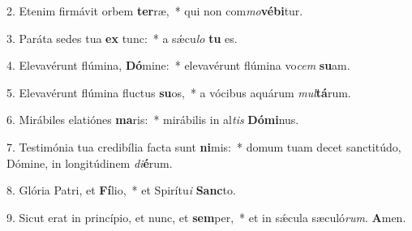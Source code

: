 2. Etenim firmávit orbem \textbf{ter}ræ,~*  qui non com\textit{mo}\textbf{vé}\textbf{bi}tur.\

3. Paráta sedes tua \textbf{ex} tunc:~*  a sǽcu\textit{lo} \textbf{tu} es.\

4. Elevavérunt flúmina, \textbf{Dó}mine:~*  elevavérunt flúmina vo\textit{cem} \textbf{su}am.\

5. Elevavérunt flúmina fluctus \textbf{su}os,~*  a vócibus aquárum \textit{mul}\textbf{tá}rum.\

6. Mirábiles elatiónes \textbf{ma}ris:~*  mirábilis in al\textit{tis} \textbf{Dó}\textbf{mi}nus.\

7. Testimónia tua credibília facta sunt \textbf{ni}mis:~*  domum tuam decet sanctitúdo, Dómine, in longitúdinem \textit{di}\textbf{é}rum.\

8. Glória Patri, et \textbf{Fí}lio,~*  et Spirítu\textit{i} \textbf{Sanc}to.\

9. Sicut erat in princípio, et nunc, et \textbf{sem}per,~*  et in sǽcula sæculó\textit{rum}. \textbf{A}men.\

